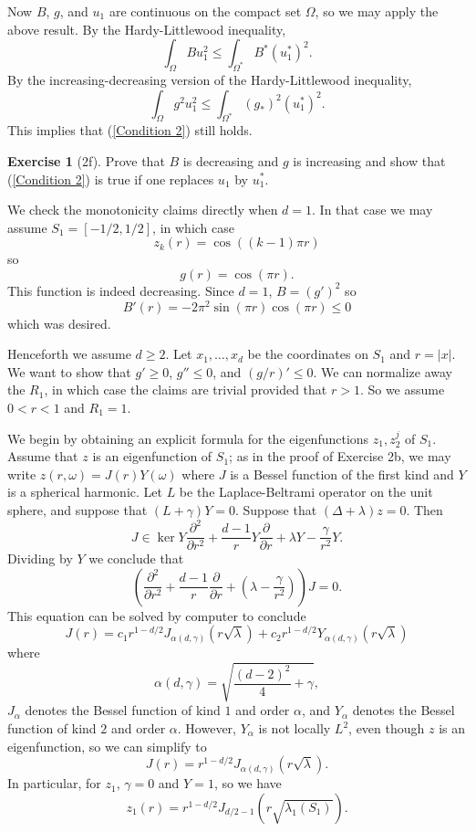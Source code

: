 \documentclass[10pt]{article}
\theoremstyle{definition}
\newtheorem{exer}{Exercise}
\begin{document}
Now $B$, $g$, and $u_1$ are continuous on the compact set $\Omega$, so we may apply the above result.
By the Hardy-Littlewood inequality,
$$\int_\Omega Bu_1^2 \leq \int_{\Omega^*} B^* (u_1^*)^2.$$
By the increasing-decreasing version of the Hardy-Littlewood inequality,
$$\int_\Omega g^2u_1^2 \leq \int_{\Omega^*} (g_*)^2 (u_1^*)^2.$$
This implies that (\ref{Condition 2}) still holds.

\begin{exer}[2f]
Prove that $B$ is decreasing and $g$ is increasing and show that (\ref{Condition 2}) is true if one replaces $u_1$ by $u_1^*$.
\end{exer}

We check the monotonicity claims directly when $d = 1$.
In that case we may assume $S_1 = [-1/2, 1/2]$, in which case
$$z_k(r) = \cos((k-1)\pi r)$$
so
$$g(r) = \cos(\pi r).$$
This function is indeed decreasing.
Since $d = 1$, $B = (g')^2$ so
$$B'(r) = -2\pi^2 \sin(\pi r)\cos(\pi r) \leq 0$$
which was desired.

Henceforth we assume $d \geq 2$.
Let $x_1, \dots, x_d$ be the coordinates on $S_1$ and $r = |x|$.
We want to show that $g' \geq 0$, $g'' \leq 0$, and $(g/r)' \leq 0$.
We can normalize away the $R_1$, in which case the claims are trivial provided that $r > 1$.
So we assume $0 < r < 1$ and $R_1 = 1$.

We begin by obtaining an explicit formula for the eigenfunctions $z_1,z_2^j$ of $S_1$.
Assume that $z$ is an eigenfunction of $S_1$; as in the proof of Exercise 2b, we may write $z(r, \omega) = J(r)Y(\omega)$ where $J$ is a Bessel function of the first kind and $Y$ is a spherical harmonic.
Let $L$ be the Laplace-Beltrami operator on the unit sphere, and suppose that $(L + \gamma)Y = 0$.
Suppose that $(\Delta + \lambda)z = 0$. Then
$$J \in \ker Y \frac{\partial^2}{\partial r^2} + \frac{d - 1}{r} Y \frac{\partial}{\partial r} + \lambda Y - \frac{\gamma}{r^2} Y.$$
Dividing by $Y$ we conclude that
$$\left(\frac{\partial^2}{\partial r^2} + \frac{d - 1}{r} \frac{\partial}{\partial r} + \left(\lambda - \frac{\gamma}{r^2}\right) \right) J = 0.$$
This equation can be solved by computer to conclude
$$J(r) = c_1 r^{1-d/2} J_{\alpha(d, \gamma)}(r\sqrt \lambda) + c_2 r^{1-d/2} Y_{\alpha(d, \gamma)}(r \sqrt \lambda)$$
where
$$\alpha(d, \gamma) = \sqrt{\frac{(d-2)^2}{4} + \gamma},$$
$J_\alpha$ denotes the Bessel function of kind $1$ and order $\alpha$, and $Y_\alpha$ denotes the Bessel function of kind $2$ and order $\alpha$.
However, $Y_\alpha$ is not locally $L^2$, even though $z$ is an eigenfunction, so we can simplify to
\begin{equation}
\label{Bessel}
J(r) = r^{1-d/2} J_{\alpha(d, \gamma)}(r\sqrt \lambda).
\end{equation}
In particular, for $z_1$, $\gamma = 0$ and $Y = 1$, so we have
$$z_1(r) = r^{1-d/2} J_{d/2 - 1}(r\sqrt{\lambda_1(S_1)}).$$
\end{document}
